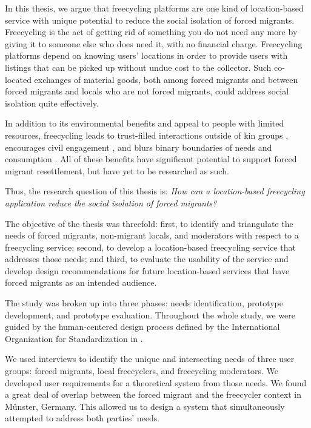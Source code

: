In this thesis, we argue that freecycling platforms are one kind of location-based service with unique potential to reduce the social isolation of forced migrants. Freecycling is the act of getting rid of something you do not need any more by giving it to someone else who does need it, with no financial charge. Freecycling platforms depend on knowing users' locations in order to provide users with listings that can be picked up without undue cost to the collector. Such co-located exchanges of material goods, both among forced migrants and between forced migrants and locals who are not forced migrants, could address social isolation quite effectively.

In addition to its environmental benefits and appeal to people with limited resources, freecycling leads to trust-filled interactions outside of kin groups \cite{nelson_trash_2009}, encourages civil engagement \cite{nelson_downshifting_2007}, and blurs binary boundaries of needs and consumption \cite{eden_blurring_2017}. All of these benefits have significant potential to support forced migrant resettlement, but have yet to be researched as such.

Thus, the research question of this thesis is: \textit{How can a location-based freecycling application reduce the social isolation of forced migrants?}

The objective of the thesis was threefold: first, to identify and triangulate the needs of forced migrants, non-migrant locals, and moderators with respect to a freecycling service; second, to develop a location-based freecycling service that addresses those needs; and third, to evaluate the usability of the service and develop design recommendations for future location-based services that have forced migrants as an intended audience.


The study was broken up into three phases: needs identification, prototype development, and prototype evaluation. Throughout the whole study, we were guided by the human-centered design process defined by the International Organization for Standardization in .

We used interviews to identify the unique and intersecting needs of three user groups: forced migrants, local freecyclers, and freecycling moderators. We developed user requirements for a theoretical system from those needs. We found a great deal of overlap between the forced migrant and the freecycler context in Münster, Germany. This allowed us to design a system that simultaneously attempted to address both parties' needs.

